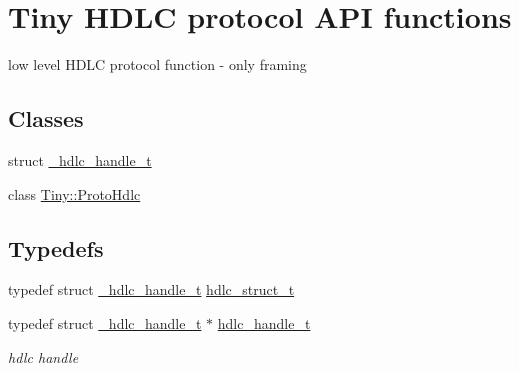 \hypertarget{group__HDLC__API}{}\section{Tiny H\+D\+LC protocol A\+PI functions}
\label{group__HDLC__API}


low level H\+D\+LC protocol function -\/ only framing  


\subsection*{Classes}
\begin{DoxyCompactItemize}
\item 
struct \hyperlink{struct__hdlc__handle__t}{\+\_\+hdlc\+\_\+handle\+\_\+t}
\item 
class \hyperlink{classTiny_1_1ProtoHdlc}{Tiny\+::\+Proto\+Hdlc}
\end{DoxyCompactItemize}
\subsection*{Typedefs}
\begin{DoxyCompactItemize}
\item 
typedef struct \hyperlink{struct__hdlc__handle__t}{\+\_\+hdlc\+\_\+handle\+\_\+t} \hyperlink{group__HDLC__API_ga4537a8665b2abe023cb7fe40ea1bd024}{hdlc\+\_\+struct\+\_\+t}
\item 
\mbox{\label{group__HDLC__API_gabeaf7578aed5279d3af891bd85a9f961}} 
typedef struct \hyperlink{struct__hdlc__handle__t}{\+\_\+hdlc\+\_\+handle\+\_\+t} $\ast$ \hyperlink{group__HDLC__API_gabeaf7578aed5279d3af891bd85a9f961}{hdlc\+\_\+handle\+\_\+t}
\begin{DoxyCompactList}\small\item\em hdlc handle \end{DoxyCompactList}\end{DoxyCompactItemize}
